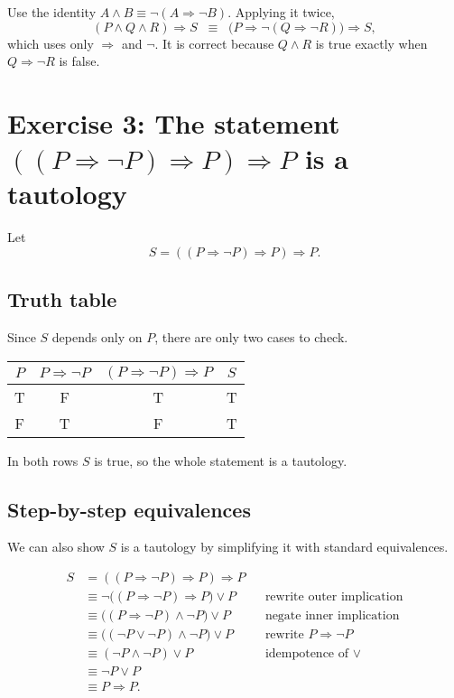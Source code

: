 \documentclass[11pt]{article}
\begin{document}
Use the identity $A \land B \equiv \neg(A \Rightarrow \neg B)$. Applying it twice,
\[
(P \land Q \land R) \Rightarrow S
\;\;\equiv\;\;
\bigl(P \Rightarrow \neg(Q \Rightarrow \neg R)\bigr) \Rightarrow S,
\]
which uses only $\Rightarrow$ and $\neg$. It is correct because $Q \land R$ is true exactly when $Q \Rightarrow \neg R$ is false.

\bigskip

\section*{Exercise 3: The statement $((P \Rightarrow \neg P)\Rightarrow P)\Rightarrow P$ is a tautology}

Let
\[
S = ((P \Rightarrow \neg P)\Rightarrow P)\Rightarrow P.
\]

\subsection*{Truth table}

Since $S$ depends only on $P$, there are only two cases to check.

\begin{center}
\renewcommand{\arraystretch}{1.15}
\begin{tabular}{|c||c|c|c|}
\hline
$P$ & $P \Rightarrow \neg P$ & $(P \Rightarrow \neg P)\Rightarrow P$ & $S$ \\
\hline
T & F & T & T \\
F & T & F & T \\
\hline
\end{tabular}
\end{center}

In both rows $S$ is true, so the whole statement is a tautology.

\subsection*{Step-by-step equivalences}

We can also show $S$ is a tautology by simplifying it with standard equivalences.

\begin{align*}
S
&= ((P \Rightarrow \neg P)\Rightarrow P)\Rightarrow P \\
&\equiv \neg\bigl((P \Rightarrow \neg P)\Rightarrow P\bigr) \lor P
&& \text{rewrite outer implication} \\
&\equiv \bigl((P \Rightarrow \neg P) \land \neg P\bigr) \lor P
&& \text{negate inner implication} \\
&\equiv \bigl((\neg P \lor \neg P) \land \neg P\bigr) \lor P
&& \text{rewrite } P \Rightarrow \neg P \\
&\equiv (\neg P \land \neg P) \lor P
&& \text{idempotence of $\lor$} \\
&\equiv \neg P \lor P \\
&\equiv P \Rightarrow P.
\end{align*}
\end{document}
